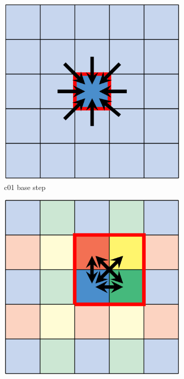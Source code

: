 \begin{figure}[htbp]
    \centering
    \begin{subfigure}[b]{0.25\textwidth}
        \centering
        \includegraphics[width=\linewidth]{imgs/c01.png}
        \caption{\scriptsize c01 base step}
        \label{fig:c01}
    \end{subfigure}
    \hspace{1em}
    \begin{subfigure}[b]{0.25\textwidth}
        \centering
        \includegraphics[width=\linewidth]{imgs/c08.png}

\end{subfigure}
\end{figure}
